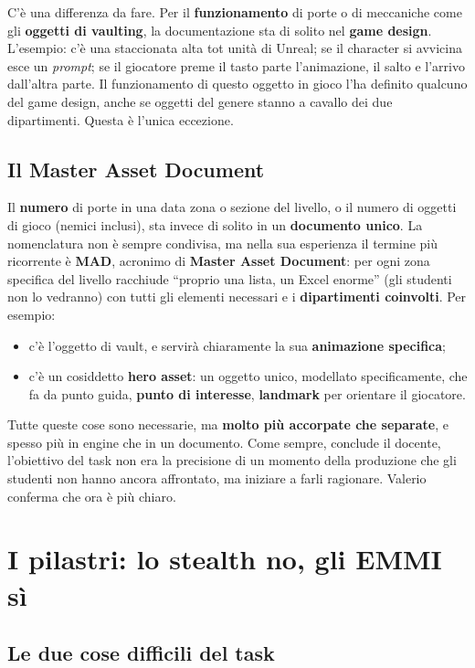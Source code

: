 C'è una differenza da fare. Per il \textbf{funzionamento} di porte o di
meccaniche come gli \textbf{oggetti di vaulting}, la documentazione sta di
solito nel \textbf{game design}. L'esempio: c'è una staccionata alta tot
unità di Unreal; se il character si avvicina esce un \emph{prompt}; se il
giocatore preme il tasto parte l'animazione, il salto e l'arrivo dall'altra
parte. Il funzionamento di questo oggetto in gioco l'ha definito qualcuno
del game design, anche se oggetti del genere stanno a cavallo dei due
dipartimenti. Questa è l'unica eccezione.

\subsection{Il Master Asset Document}

Il \textbf{numero} di porte in una data zona o sezione del livello, o il
numero di oggetti di gioco (nemici inclusi), sta invece di solito in un
\textbf{documento unico}. La nomenclatura non è sempre condivisa, ma nella
sua esperienza il termine più ricorrente è \textbf{MAD}, acronimo di
\textbf{Master Asset Document}: per ogni zona specifica del livello
racchiude ``proprio una lista, un Excel enorme'' (gli studenti non lo
vedranno) con tutti gli elementi necessari e i \textbf{dipartimenti
coinvolti}. Per esempio:
\begin{itemize}
  \item c'è l'oggetto di vault, e servirà chiaramente la sua
        \textbf{animazione specifica};
  \item c'è un cosiddetto \textbf{hero asset}: un oggetto unico, modellato
        specificamente, che fa da punto guida, \textbf{punto di interesse},
        \textbf{landmark} per orientare il giocatore.
\end{itemize}
Tutte queste cose sono necessarie, ma \textbf{molto più accorpate che
separate}, e spesso più in engine che in un documento. Come sempre, conclude
il docente, l'obiettivo del task non era la precisione di un momento della
produzione che gli studenti non hanno ancora affrontato, ma iniziare a farli
ragionare. Valerio conferma che ora è più chiaro.

\section{I pilastri: lo stealth no, gli EMMI sì}
\label{gd15:sec:pilastri}

\subsection{Le due cose difficili del task}

